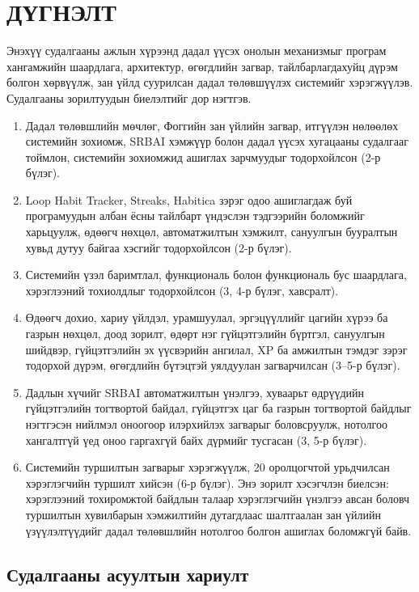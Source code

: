 \chapter*{ДҮГНЭЛТ}

Энэхүү судалгааны ажлын хүрээнд дадал үүсэх онолын механизмыг програм хангамжийн шаардлага, архитектур, өгөгдлийн загвар, тайлбарлагдахуйц дүрэм болгон хөрвүүлж, зан үйлд суурилсан дадал төлөвшүүлэх системийг хэрэгжүүлэв. Судалгааны зорилтуудын биелэлтийг дор нэгтгэв.

\begin{enumerate}
    \item Дадал төлөвшлийн мөчлөг, Фоггийн зан үйлийн загвар, итгүүлэн нөлөөлөх системийн зохиомж, SRBAI хэмжүүр болон дадал үүсэх хугацааны судалгааг тоймлон, системийн зохиомжид ашиглах зарчмуудыг тодорхойлсон (2-р бүлэг).
    \item Loop Habit Tracker, Streaks, Habitica зэрэг одоо ашиглагдаж буй програмуудын албан ёсны тайлбарт үндэслэн тэдгээрийн боломжийг харьцуулж, өдөөгч нөхцөл, автоматжилтын хэмжилт, сануулгын бууралтын хувьд дутуу байгаа хэсгийг тодорхойлсон (2-р бүлэг).
    \item Системийн үзэл баримтлал, функциональ болон функциональ бус шаардлага, хэрэглээний тохиолдлыг тодорхойлсон (3, 4-р бүлэг, хавсралт).
    \item Өдөөгч дохио, хариу үйлдэл, урамшуулал, эргэцүүллийг цагийн хүрээ ба газрын нөхцөл, доод зорилт, өдөрт нэг гүйцэтгэлийн бүртгэл, сануулгын шийдвэр, гүйцэтгэлийн эх үүсвэрийн ангилал, XP ба амжилтын тэмдэг зэрэг тодорхой дүрэм, өгөгдлийн бүтэцтэй уялдуулан загварчилсан (3--5-р бүлэг).
    \item Дадлын хүчийг SRBAI автоматжилтын үнэлгээ, хуваарьт өдрүүдийн гүйцэтгэлийн тогтвортой байдал, гүйцэтгэх цаг ба газрын тогтвортой байдлыг нэгтгэсэн нийлмэл оноогоор илэрхийлэх загварыг боловсруулж, нотолгоо хангалтгүй үед оноо гаргахгүй байх дүрмийг тусгасан (3, 5-р бүлэг).
    \item Системийн туршилтын загварыг хэрэгжүүлж, 20 оролцогчтой урьдчилсан хэрэглэгчийн туршилт хийсэн (6-р бүлэг). Энэ зорилт хэсэгчлэн биелсэн: хэрэглээний тохиромжтой байдлын талаар хэрэглэгчийн үнэлгээ авсан боловч туршилтын хувилбарын хэмжилтийн дутагдлаас шалтгаалан зан үйлийн үзүүлэлтүүдийг дадал төлөвшлийн нотолгоо болгон ашиглах боломжгүй байв.
\end{enumerate}

\section*{Судалгааны асуултын хариулт}

